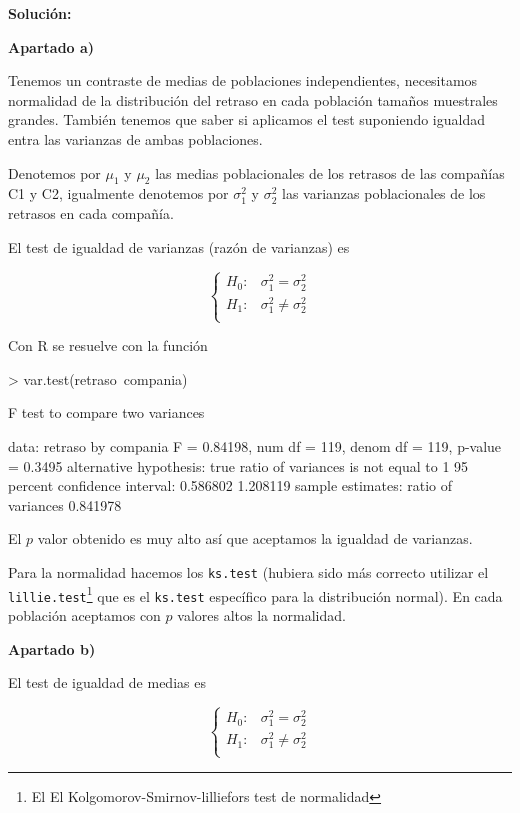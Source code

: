 \documentclass[10pt]{article}
\newif\ifsol
\begin{document}
\ifsol
{\sf
\textbf{Solución:}

\textbf{Apartado a)}

Tenemos un contraste de medias de poblaciones independientes, necesitamos normalidad de la distribución del retraso en cada población tamaños muestrales grandes. También tenemos que saber si aplicamos el test suponiendo igualdad  entra las varianzas de ambas poblaciones.

Denotemos por $\mu_1 $ y $\mu_2$ las medias poblacionales de los retrasos de las compañías C1 y C2,  igualmente denotemos por $\sigma_1^2$ y $\sigma_2^2$ las varianzas poblacionales de los retrasos en cada compañía.

El test de igualdad de varianzas (razón de varianzas) es 

$$\left\{
\begin{array}{ll}
H_0: & \sigma_1^2=\sigma_2^2\\
H_1: & \sigma_1^2\not=\sigma_2^2\\
\end{array}
\right.
$$

Con R se resuelve con la función

\begin{Schunk}
\begin{Sinput}
> var.test(retraso~compania)
\end{Sinput}
\begin{Soutput}
	F test to compare two variances

data:  retraso by compania
F = 0.84198, num df = 119, denom df = 119, p-value = 0.3495
alternative hypothesis: true ratio of variances is not equal to 1
95 percent confidence interval:
 0.586802 1.208119
sample estimates:
ratio of variances 
          0.841978 
\end{Soutput}
\end{Schunk}


El $p$ valor obtenido es muy alto así que aceptamos la igualdad de varianzas.


Para la normalidad hacemos los \texttt{ks.test} (hubiera sido más correcto utilizar el \texttt{lillie.test}\footnote{El El Kolgomorov-Smirnov-lilliefors test de normalidad} que es el \texttt{ks.test} específico para la distribución normal). En cada población aceptamos con $p$ valores altos la normalidad.

\textbf{Apartado b)}

El test de igualdad de medias es 


$$\left\{
\begin{array}{ll}
H_0: & \sigma_1^2=\sigma_2^2\\
H_1: & \sigma_1^2\not=\sigma_2^2\\
\end{array}
\right.
$$



}
\end{document}
